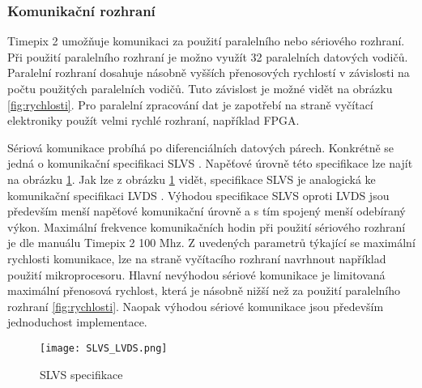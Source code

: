 \subsubsection{Komunikační rozhraní}
\label{Komunikacni rozhrani}
Timepix 2 umožňuje komunikaci za použití paralelního nebo sériového rozhraní. Při použití paralelního rozhraní je možno využít 32 paralelních datových vodičů. Paralelní rozhraní dosahuje násobně vyšších přenosových rychlostí v závislosti na počtu použitých paralelních vodičů. Tuto závislost je možné vidět na obrázku \ref{fig:rychlosti}. Pro paralelní zpracování dat je zapotřebí na straně vyčítací elektroniky použít velmi rychlé rozhraní, například FPGA.  
\par Sériová komunikace probíhá po diferenciálních datových párech. Konkrétně se jedná o komunikační specifikaci SLVS \cite{SLVS}. Napěťové úrovně této specifikace lze najít na obrázku \ref{fig:SLVS_LVDS}. Jak lze z obrázku \ref{fig:SLVS_LVDS} vidět, specifikace SLVS je analogická ke komunikační specifikaci LVDS \cite{LVDS}. Výhodou specifikace SLVS oproti LVDS jsou především menší napěťové komunikační úrovně a s tím spojený menší odebíraný výkon. Maximální frekvence komunikačních hodin při použití sériového rozhraní je dle manuálu Timepix 2 \cite{tpx2_manual} 100 Mhz. Z uvedených parametrů týkající se maximální rychlosti komunikace, lze na straně vyčítacího rozhraní navrhnout například použití mikroprocesoru. Hlavní nevýhodou sériové komunikace je limitovaná maximální přenosová rychlost, která je násobně nižší než za použití paralelního rozhraní \ref{fig:rychlosti}. Naopak výhodou sériové komunikace jsou především jednoduchost implementace.
\begin{figure}[h!]
	\centering
	\captionsetup{justification=centering}
	\texttt{[image: SLVS\_LVDS.png]}
	\caption{SLVS specifikace \cite{SLVS}} 
	\label{fig:SLVS_LVDS}
\end{figure}	

